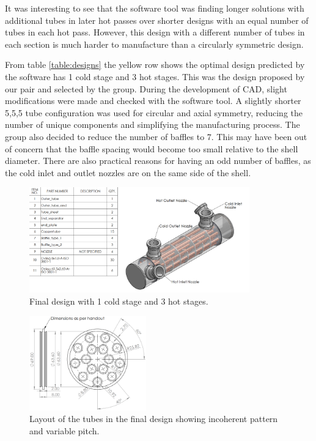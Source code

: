 \documentclass{article}
\begin{document}
It was interesting to see that the software tool was finding longer solutions with additional tubes in later hot passes over shorter designs with an equal number of tubes in each hot pass.
However, this design with a different number of tubes in each section is much harder to manufacture than a circularly symmetric design.

From table \ref{table:designs} the yellow row shows the optimal design predicted by the software has 1 cold stage and 3 hot stages.
This was the design proposed by our pair and selected by the group.
During the development of CAD, slight modifications were made and checked with the software tool.
A slightly shorter 5,5,5 tube configuration was used for circular and axial symmetry, reducing the number of unique components and simplifying the manufacturing process.
The group also decided to reduce the number of baffles to 7.
This may have been out of concern that the baffle spacing would become too small relative to the shell diameter.
There are also practical reasons for having an odd number of baffles, as the cold inlet and outlet nozzles are on the same side of the shell.

\begin{figure}[H]
  \centering
  \includegraphics[width=0.85\textwidth]{final.png}
  \caption{Final design with 1 cold stage and 3 hot stages.}
  \label{fig:final_design}
\end{figure}

\begin{figure}[H]
  \centering
  \includegraphics[width=0.45\textwidth]{final_tube_layout.png}
  \caption{Layout of the tubes in the final design showing incoherent pattern and variable pitch.}
  \label{fig:final_tube_layout}
\end{figure}
\end{document}
